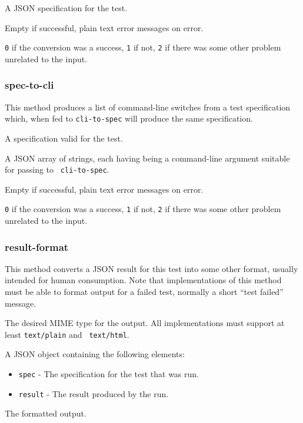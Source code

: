 \documentclass[10pt,titlepage]{article}
\begin{document}
 A JSON specification for the test.

 Empty if successful, plain text error
messages on error.

 {\tt 0} if the conversion was a success,
            {\tt 1} if not, {\tt 2} if there was some other problem
            unrelated to the input.



\subsubsection{spec-to-cli}
This method produces a list of command-line switches from a test
specification which, when fed to {\tt cli-to-spec} will produce the
same specification.

 A specification valid for the test.

 A JSON array of strings, each having
being a command-line argument suitable for passing to {\tt
  cli-to-spec}.

 Empty if successful, plain text error
messages on error.

 {\tt 0} if the conversion was a success,
            {\tt 1} if not, {\tt 2} if there was some other problem
            unrelated to the input.


\subsubsection{result-format}
This method converts a JSON result for this test into some other
format, usually intended for human consumption.  Note that
implementations of this method must be able to format output for a
failed test, normally a short ``test failed'' message.

 The desired MIME type for the output.  All
implementations must support at least {\tt text/plain} and {\tt
  text/html}.

 A JSON object containing the following
elements:
\begin{itemize}
\item{\tt spec} - The specification for the test that was run.
\item{\tt result} - The result produced by the run.
\end{itemize}

 The formatted output.
\end{document}
